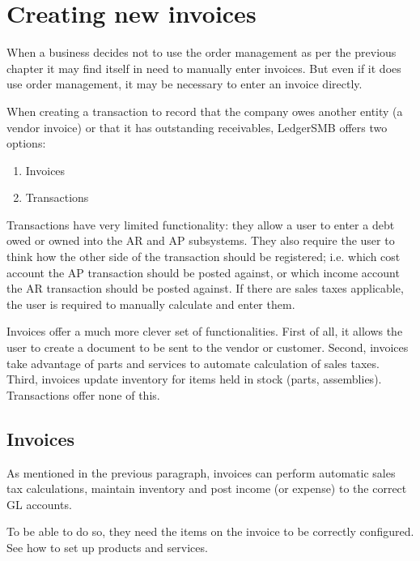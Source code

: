 \section{Creating new invoices}
\label{sec:ManuallyCreatingInvoices}



When a business decides not to use the order management as per the previous
chapter it may find itself in need to manually enter invoices. But even
if it does use order management, it may be necessary to enter an invoice
directly.

When creating a transaction to record that the company owes another
entity (a vendor invoice) or that it has outstanding receivables,
LedgerSMB offers two options:

\begin{enumerate}
\item Invoices
\item Transactions
\end{enumerate}

Transactions have very limited functionality: they allow a user to enter
a debt owed or owned into the AR and AP subsystems. They also require the
user to think how the other side of the transaction should be registered;
i.e. which cost account the AP transaction should be posted against, or
which income account the AR transaction should be posted against. If there
are sales taxes applicable, the user is required to manually calculate and
enter them.

Invoices offer a much more clever set of functionalities. First of all, it
allows the user to create a document to be sent to the vendor or customer.
Second, invoices take advantage of parts and services
to automate calculation of sales taxes. Third, invoices update inventory
for items held in stock (parts, assemblies). Transactions offer none of this.

\subsection{Invoices}

As mentioned in the previous paragraph, invoices can perform automatic
sales tax calculations, maintain inventory and post income (or expense)
to the correct GL accounts.

To be able to do so, they need the items on the invoice to be correctly
configured. See  how to set up products
and services.

